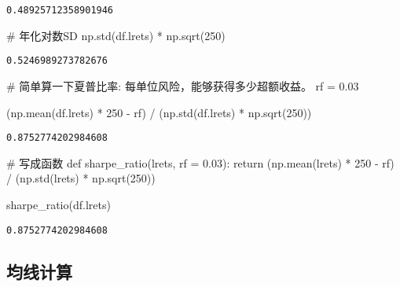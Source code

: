 \documentclass[
  letterpaper,
  DIV=11,
  numbers=noendperiod]{scrreprt}
\newenvironment{Shaded}{\begin{snugshade}}{\end{snugshade}}
\newcommand{\CommentTok}[1]{\textcolor[rgb]{0.37,0.37,0.37}{#1}}
\newcommand{\ControlFlowTok}[1]{\textcolor[rgb]{0.00,0.23,0.31}{#1}}
\newcommand{\DecValTok}[1]{\textcolor[rgb]{0.68,0.00,0.00}{#1}}
\newcommand{\FloatTok}[1]{\textcolor[rgb]{0.68,0.00,0.00}{#1}}
\newcommand{\KeywordTok}[1]{\textcolor[rgb]{0.00,0.23,0.31}{#1}}
\newcommand{\NormalTok}[1]{\textcolor[rgb]{0.00,0.23,0.31}{#1}}
\newcommand{\OperatorTok}[1]{\textcolor[rgb]{0.37,0.37,0.37}{#1}}
\begin{document}
\begin{verbatim}
0.48925712358901946
\end{verbatim}

\begin{Shaded}
\begin{Highlighting}[]
\CommentTok{\# 年化对数SD}
\NormalTok{np.std(df.lrets) }\OperatorTok{*}\NormalTok{ np.sqrt(}\DecValTok{250}\NormalTok{)}
\end{Highlighting}
\end{Shaded}

\begin{verbatim}
0.5246989273782676
\end{verbatim}

\begin{Shaded}
\begin{Highlighting}[]
\CommentTok{\# 简单算一下夏普比率: 每单位风险，能够获得多少超额收益。}
\NormalTok{rf }\OperatorTok{=} \FloatTok{0.03}

\NormalTok{(np.mean(df.lrets) }\OperatorTok{*} \DecValTok{250} \OperatorTok{{-}}\NormalTok{ rf) }\OperatorTok{/}\NormalTok{ (np.std(df.lrets) }\OperatorTok{*}\NormalTok{ np.sqrt(}\DecValTok{250}\NormalTok{))}
\end{Highlighting}
\end{Shaded}

\begin{verbatim}
0.8752774202984608
\end{verbatim}

\begin{Shaded}
\begin{Highlighting}[]
\CommentTok{\# 写成函数}
\KeywordTok{def}\NormalTok{ sharpe\_ratio(lrets, rf }\OperatorTok{=} \FloatTok{0.03}\NormalTok{):}
    \ControlFlowTok{return}\NormalTok{ (np.mean(lrets) }\OperatorTok{*} \DecValTok{250} \OperatorTok{{-}}\NormalTok{ rf) }\OperatorTok{/}\NormalTok{ (np.std(lrets) }\OperatorTok{*}\NormalTok{ np.sqrt(}\DecValTok{250}\NormalTok{))}

\NormalTok{sharpe\_ratio(df.lrets)}
\end{Highlighting}
\end{Shaded}

\begin{verbatim}
0.8752774202984608
\end{verbatim}

\hypertarget{ux5747ux7ebfux8ba1ux7b97}{%
\subsection{均线计算}\label{ux5747ux7ebfux8ba1ux7b97}}
\end{document}
